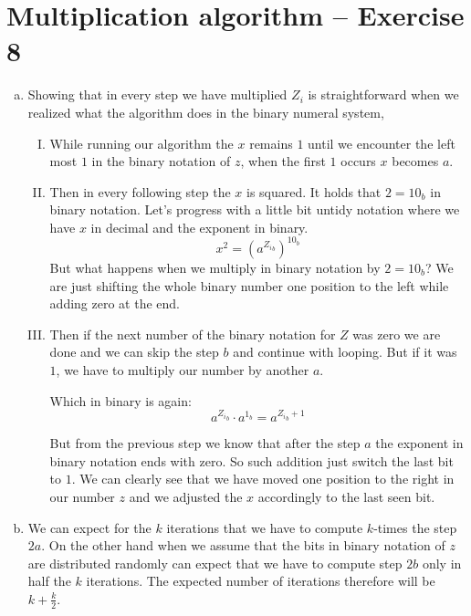 \documentclass[a4paper,10pt]{article}
\begin{document}
\section*{Multiplication algorithm -- Exercise 8}
\begin{enumerate}[a)]
\item Showing that in every step we have multiplied $Z_i$ is straightforward when we realized what the algorithm does in the binary numeral system,

\begin{enumerate}[I.]
\item While running our algorithm the $x$ remains $1$ until we encounter the left most $1$ in the binary notation of $z$, when the first $1$ occurs $x$ becomes $a$.

\item Then in every following step the $x$ is squared. It holds that $2=10_b$ in binary notation. Let's progress with a little bit untidy notation where we have $x$ in decimal and the exponent in binary.
$$
x^{2} = (a^{{Z_i}_b})^{10_b}
$$
But what happens when we multiply in binary notation by $2=10_b$? We are just shifting the whole binary number one position to the left while adding zero at the end.

\item Then if the next number of the binary notation for $Z$ was zero we are done and we can skip the step $b$ and continue with looping. But if it was $1$, we have to multiply our number by another $a$.

Which in binary is again:
$$
a^{{Z_i}_b}\cdot a^{1_b} = a^{{Z_i}_b+1}
$$

But from the previous step we know that after the step $a$ the exponent in binary notation ends with zero. So such addition just switch the last bit to $1$. We can clearly see that we have moved one position to the right in our number $z$ and we adjusted the $x$ accordingly to the last seen bit.
\end{enumerate}

\item We can expect for the $k$ iterations that we have to compute $k$-times the step $2a$. On the other hand when we assume that the bits in binary notation of $z$ are distributed randomly can expect that we have to compute step $2b$ only in half the $k$ iterations. The expected number of iterations therefore will be $k + \frac{k}{2}$.


\end{enumerate}
\end{document}

